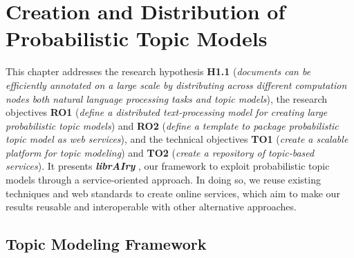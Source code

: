 

\chapter{Creation and Distribution of Probabilistic Topic Models}\label{ch:scalability}

\graphicspath{{scalability/figures/}}


This chapter addresses the research hypothesis \textbf{H1.1} (\textit{documents can be efficiently annotated on a large scale by distributing across different computation nodes both natural language processing tasks and topic models}), the research objectives \textbf{RO1} (\textit{define a distributed text-processing model for creating large probabilistic topic models}) and \textbf{RO2} (\textit{define a template to package probabilistic topic model as web services}), and the technical objectives \textbf{TO1} (\textit{create a scalable platform for topic modeling}) and \textbf{TO2} (\textit{create a repository of topic-based services}). It presents \textit{\textbf{librAIry}} \citep{Badenes-Olmedo2017}, our framework to exploit probabilistic topic models through a service-oriented approach. In doing so, we reuse existing techniques and web standards to create online services, which aim to make our results reusable and interoperable with other alternative approaches.


\section{Topic Modeling Framework}
\label{sec:topic-model-framework}


